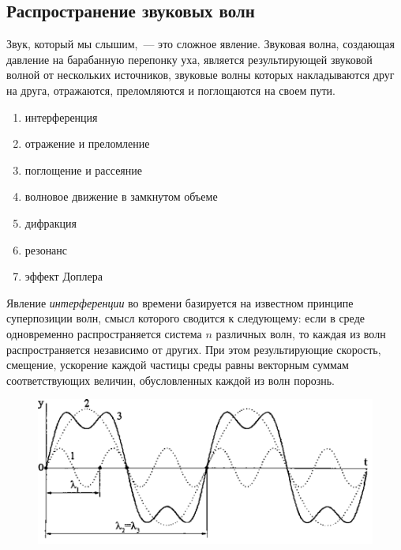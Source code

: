 \documentclass{beamer}
\begin{document}
\subsection{Распространение звуковых волн}
\begin{frame}
Звук, который мы слышим,~--- это сложное явление. Звуковая волна, создающая давление на барабанную перепонку уха, является результирующей звуковой волной от нескольких источников, звуковые волны которых накладываются друг на друга, отражаются, преломляются и поглощаются на своем пути.
\begin{enumerate}
\item интерференция
\item отражение и преломление
\item поглощение и рассеяние
\item волновое движение в замкнутом объеме
\item дифракция
\item резонанс
\item эффект Доплера
\end{enumerate}
\end{frame}

\begin{frame}
Явление {\itshape интерференции} во времени базируется на известном принципе суперпозиции волн, смысл которого сводится к следующему: если в среде одновременно распространяется система $n$ различных волн, то каждая из волн распространяется независимо от других. При этом результирующие скорость, смещение, ускорение каждой частицы среды равны векторным суммам соответствующих величин, обусловленных каждой из волн порознь.
\begin{figure}[h]
\centering
\includegraphics[scale=0.8]{pic-interferention-01}
\end{figure}
\end{frame}
\end{document}
